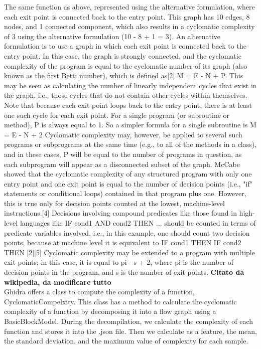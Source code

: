 The same function as above, represented using the alternative formulation, where each exit point is connected back to the entry point. This graph has 10 edges, 8 nodes, and 1 connected component, which also results in a cyclomatic complexity of 3 using the alternative formulation (10 - 8 + 1 = 3).
An alternative formulation is to use a graph in which each exit point is connected back to the entry point. In this case, the graph is strongly connected, and the cyclomatic complexity of the program is equal to the cyclomatic number of its graph (also known as the first Betti number), which is defined as[2]
M = E - N + P.
This may be seen as calculating the number of linearly independent cycles that exist in the graph, i.e., those cycles that do not contain other cycles within themselves. Note that because each exit point loops back to the entry point, there is at least one such cycle for each exit point.
For a single program (or subroutine or method), P is always equal to 1. So a simpler formula for a single subroutine is
M = E - N + 2
Cyclomatic complexity may, however, be applied to several such programs or subprograms at the same time (e.g., to all of the methods in a class), and in these cases, P will be equal to the number of programs in question, as each subprogram will appear as a disconnected subset of the graph.
McCabe showed that the cyclomatic complexity of any structured program with only one entry point and one exit point is equal to the number of decision points (i.e., "if" statements or conditional loops) contained in that program plus one. However, this is true only for decision points counted at the lowest, machine-level instructions.[4] Decisions involving compound predicates like those found in high-level languages like IF cond1 AND cond2 THEN ... should be counted in terms of predicate variables involved, i.e., in this example, one should count two decision points, because at machine level it is equivalent to IF cond1 THEN IF cond2 THEN [2][5]
Cyclomatic complexity may be extended to a program with multiple exit points; in this case, it is equal to
pi - s + 2,
where pi is the number of decision points in the program, and s is the number of exit points.\cite{complexity}  \textbf{Citato da wikipedia, da modificare tutto}\\

Ghidra offers a class to compute the complexity of a function, CyclomaticCompelxity. This class has a method to calculate the cyclomatic complexity of a function by decomposing it into a flow graph using a BasicBlockModel. During the decompilation, we calculate the complexity of each function and stores it into the .json file. Then we calculate as a feature, the mean, the standard deviation, and the maximum value of complexity for each sample.

